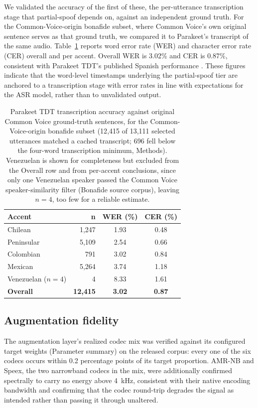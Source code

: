 \documentclass[11pt]{article}
\begin{document}
We validated the accuracy of the first of these, the per-utterance
transcription stage that partial-spoof depends on, against an
independent ground truth. For the Common-Voice-origin bonafide subset,
where Common Voice's own original sentence serves as that ground truth,
we compared it to Parakeet's transcript of the same audio.
Table~\ref{tab:parakeetwer} reports word error rate (WER) and character
error rate (CER) overall and per accent. Overall WER is 3.02\% and CER
is 0.87\%, consistent with Parakeet TDT's published Spanish performance
\citep{parakeet}. These figures indicate that the word-level timestamps
underlying the partial-spoof tier are anchored to a transcription stage
with error rates in line with expectations for the ASR model, rather
than to unvalidated output.

\begin{table}[t]
\centering
\caption{Parakeet TDT transcription accuracy against original Common
Voice ground-truth sentences, for the Common-Voice-origin bonafide
subset (12{,}415 of 13{,}111 selected utterances matched a cached
transcript; 696 fell below the four-word transcription minimum,
Methods). Venezuelan is shown for completeness but excluded from the
Overall row and from per-accent conclusions, since only one Venezuelan
speaker passed the Common Voice speaker-similarity filter (Bonafide
source corpus), leaving $n=4$, too few for a reliable estimate.}
\label{tab:parakeetwer}
\small
\begin{tabular}{lrcc}
\toprule
\textbf{Accent} & \textbf{n} & \textbf{WER (\%)} & \textbf{CER (\%)} \\
\midrule
Chilean       &  1{,}247 & 1.93 & 0.48 \\
Peninsular    &  5{,}109 & 2.54 & 0.66 \\
Colombian     &    791 & 3.02 & 0.84 \\
Mexican       &  5{,}264 & 3.74 & 1.18 \\
Venezuelan ($n{=}4$) &   4 & 8.33 & 1.61 \\
\midrule
\textbf{Overall} & \textbf{12{,}415} & \textbf{3.02} & \textbf{0.87} \\
\bottomrule
\end{tabular}
\end{table}

\subsection*{Augmentation fidelity}

The augmentation layer's realized codec mix was verified against its
configured target weights (Parameter summary) on the released corpus:
every one of the six codecs occurs within 0.2 percentage points of its
target proportion. AMR-NB and Speex, the two narrowband codecs in the
mix, were additionally confirmed spectrally to carry no energy above
\SI{4}{\kilo\hertz}, consistent with their native encoding bandwidth and
confirming that the codec round-trip degrades the signal as intended
rather than passing it through unaltered.
\end{document}
